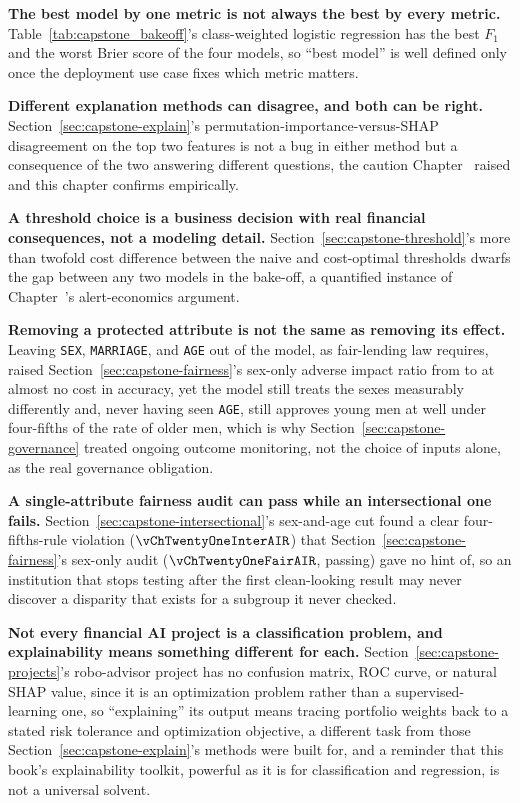 \documentclass[../ai_in_finance]{subfiles}
\begin{document}
\textbf{The best model by one metric is not always the best by every metric.} Table~\ref{tab:capstone_bakeoff}'s class-weighted logistic regression has the best $F_1$ and the worst Brier score of the four models, so ``best model'' is well defined only once the deployment use case fixes which metric matters.

\textbf{Different explanation methods can disagree, and both can be right.} Section~\ref{sec:capstone-explain}'s permutation-importance-versus-SHAP disagreement on the top two features is not a bug in either method but a consequence of the two answering different questions, the caution Chapter~ raised and this chapter confirms empirically.

\textbf{A threshold choice is a business decision with real financial consequences, not a modeling detail.} Section~\ref{sec:capstone-threshold}'s more than twofold cost difference between the naive and cost-optimal thresholds dwarfs the gap between any two models in the bake-off, a quantified instance of Chapter~'s alert-economics argument.

\textbf{Removing a protected attribute is not the same as removing its effect.} Leaving \texttt{SEX}, \texttt{MARRIAGE}, and \texttt{AGE} out of the model, as fair-lending law requires, raised Section~\ref{sec:capstone-fairness}'s sex-only adverse impact ratio from \vChTwentyOneDemoAIR{} to \vChTwentyOneFairAIR{} at almost no cost in accuracy, yet the model still treats the sexes measurably differently and, never having seen \texttt{AGE}, still approves young men at well under four-fifths of the rate of older men, which is why Section~\ref{sec:capstone-governance} treated ongoing outcome monitoring, not the choice of inputs alone, as the real governance obligation.

\textbf{A single-attribute fairness audit can pass while an intersectional one fails.} Section~\ref{sec:capstone-intersectional}'s sex-and-age cut found a clear four-fifths-rule violation ($\vChTwentyOneInterAIR$) that Section~\ref{sec:capstone-fairness}'s sex-only audit ($\vChTwentyOneFairAIR$, passing) gave no hint of, so an institution that stops testing after the first clean-looking result may never discover a disparity that exists for a subgroup it never checked.

\textbf{Not every financial AI project is a classification problem, and explainability means something different for each.} Section~\ref{sec:capstone-projects}'s robo-advisor project has no confusion matrix, ROC curve, or natural SHAP value, since it is an optimization problem rather than a supervised-learning one, so ``explaining'' its output means tracing portfolio weights back to a stated risk tolerance and optimization objective, a different task from those Section~\ref{sec:capstone-explain}'s methods were built for, and a reminder that this book's explainability toolkit, powerful as it is for classification and regression, is not a universal solvent.
\end{document}
